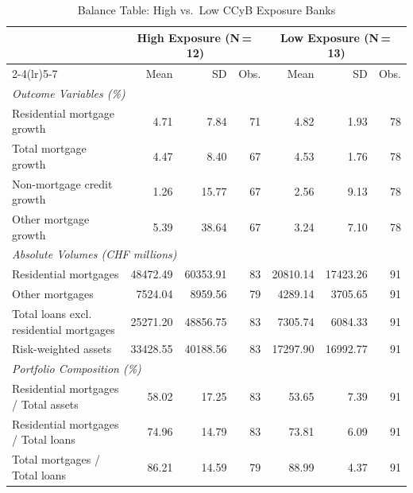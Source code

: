 \begin{table}[htbp]
\centering
\caption{Balance Table: High vs.\ Low CCyB Exposure Banks}
\label{tab:balance}
\small
\begin{tabular}{p{6.5cm} rr r rr r}
\toprule
 & \multicolumn{3}{c}{High Exposure (N\,=\,12)}
 & \multicolumn{3}{c}{Low Exposure (N\,=\,13)} \\
\cmidrule(lr){2-4}\cmidrule(lr){5-7}
 & Mean & SD & Obs. & Mean & SD & Obs. \\
\midrule
\multicolumn{7}{l}{\textit{Outcome Variables (\%)}} \\
\hspace{1em}Residential mortgage growth & 4.71 & 7.84 & 71 & 4.82 & 1.93 & 78 \\
\hspace{1em}Total mortgage growth & 4.47 & 8.40 & 67 & 4.53 & 1.76 & 78 \\
\hspace{1em}Non-mortgage credit growth & 1.26 & 15.77 & 67 & 2.56 & 9.13 & 78 \\
\hspace{1em}Other mortgage growth & 5.39 & 38.64 & 67 & 3.24 & 7.10 & 78 \\
\multicolumn{7}{l}{\textit{Absolute Volumes (CHF millions)}} \\
\hspace{1em}Residential mortgages & 48472.49 & 60353.91 & 83 & 20810.14 & 17423.26 & 91 \\
\hspace{1em}Other mortgages & 7524.04 & 8959.56 & 79 & 4289.14 & 3705.65 & 91 \\
\hspace{1em}Total loans excl. residential mortgages & 25271.20 & 48856.75 & 83 & 7305.74 & 6084.33 & 91 \\
\hspace{1em}Risk-weighted assets & 33428.55 & 40188.56 & 83 & 17297.90 & 16992.77 & 91 \\
\multicolumn{7}{l}{\textit{Portfolio Composition (\%)}} \\
\hspace{1em}Residential mortgages / Total assets & 58.02 & 17.25 & 83 & 53.65 & 7.39 & 91 \\
\hspace{1em}Residential mortgages / Total loans & 74.96 & 14.79 & 83 & 73.81 & 6.09 & 91 \\
\hspace{1em}Total mortgages / Total loans & 86.21 & 14.59 & 79 & 88.99 & 4.37 & 91 \\

\end{tabular}
\end{table}
